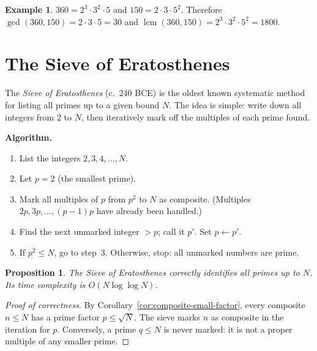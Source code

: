 \documentclass[12pt,a4paper,openany]{book}
\theoremstyle{definition}
\newtheorem{example}[definition]{Example}
\theoremstyle{plain}
\newtheorem{proposition}[definition]{Proposition}
\theoremstyle{remark}
\DeclareMathOperator{\lcm}{lcm}
\begin{document}
\begin{example}
\label{ex:fta-computation}
$360 = 2^3 \cdot 3^2 \cdot 5$ and $150 = 2 \cdot 3 \cdot 5^2$. Therefore
$\gcd(360, 150) = 2 \cdot 3 \cdot 5 = 30$ and
$\lcm(360, 150) = 2^3 \cdot 3^2 \cdot 5^2 = 1800$.
\end{example}

\section{The Sieve of Eratosthenes}
\label{sec:sieve}

The \emph{Sieve of Eratosthenes} (c.~240 BCE) is the oldest
known systematic method for listing all primes up to a given bound $N$. The
idea is simple: write down all integers from $2$ to $N$, then iteratively mark
off the multiples of each prime found.

\medskip
\noindent\textbf{Algorithm.}
\begin{enumerate}[nosep]
  \item List the integers $2, 3, 4, \ldots, N$.
  \item Let $p = 2$ (the smallest prime).
  \item Mark all multiples of $p$ from $p^2$ to $N$ as composite.
        (Multiples $2p, 3p, \ldots, (p-1)p$ have already been handled.)
  \item Find the next unmarked integer $> p$; call it $p'$. Set $p \leftarrow p'$.
  \item If $p^2 \le N$, go to step~3. Otherwise, stop: all unmarked numbers are prime.
\end{enumerate}

\begin{proposition}
\label{prop:sieve-correctness}
The Sieve of Eratosthenes correctly identifies all primes up to $N$. Its
time complexity is $O(N \log\log N)$.
\end{proposition}

\begin{proof}[Proof of correctness]
By Corollary~\ref{cor:composite-small-factor}, every composite $n \le N$ has a
prime factor $p \le \sqrt{N}$. The sieve marks $n$ as composite in the
iteration for $p$. Conversely, a prime $q \le N$ is never marked: it is not a
proper multiple of any smaller prime.
\end{proof}
\end{document}

